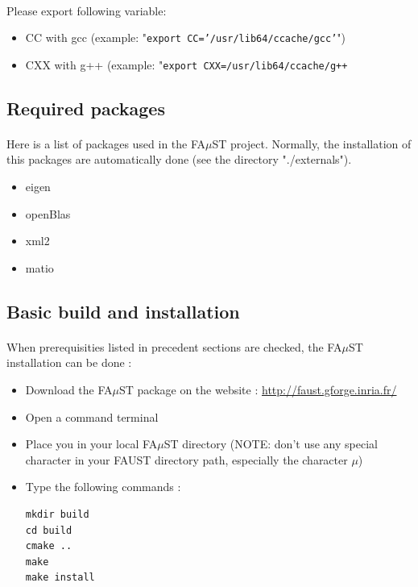 \paragraph{}Please export following variable:
\begin{itemize}
\item CC with gcc (example: "\texttt{export CC='/usr/lib64/ccache/gcc'}") 
\item CXX with g++ (example: "\texttt{export CXX=/usr/lib64/ccache/g++}
\end{itemize}

\subsection{Required packages}\label{sec:RequiredPackages}

\paragraph{}Here is a list of packages used in the FA$\mu$ST project. Normally, the installation of this packages are automatically done (see the directory "./externals").
\begin{itemize}
\item eigen
\item openBlas
\item xml2
\item matio
\end{itemize}

\subsection{Basic build and installation}\label{sec:UnixBuildInstall}
\paragraph{}When prerequisities listed in precedent sections are checked, the FA$\mu$ST installation can be done : 

\begin{itemize}
\item Download the FA$\mu$ST package on the website :  \url{http://faust.gforge.inria.fr/}
\item Open a command terminal
\item Place you in your local FA$\mu$ST directory (NOTE: don't use any special character in your FAUST directory path, especially the character $\mu$)
\item Type the following commands : 

\begin{lstlisting}
mkdir build
cd build
cmake ..
make
make install
\end{lstlisting}
\end{itemize}

